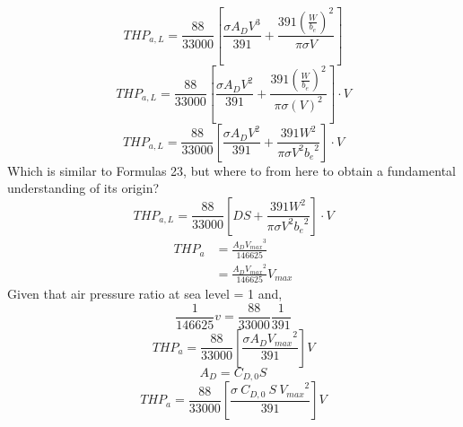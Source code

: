 \documentclass{article}
\begin{document}
\[
THP_{a,L}=\frac{88}{33000}\left[\frac{\sigma A_D V^3}{391}+\frac{391\left(\frac{W}{b_e}\right)^2}{\pi \sigma V}\right]
\]
\[
THP_{a,L}=\frac{88}{33000}\left[\frac{\sigma A_D V^2}{391}+\frac{391\left(\frac{W}{b_e}\right)^2}{\pi \sigma (V)^2}\right]\cdot V
\]
\[
THP_{a,L}=\frac{88}{33000}\left[\frac{\sigma A_D V^2}{391}+\frac{391W^2}{\pi \sigma V^2{b_e}^2}\right]\cdot V
\]
Which is similar to Formulas 23, but where to from here to obtain a fundamental understanding of its origin?
\[
THP_{a,L}=\frac{88}{33000}\left[DS+\frac{391W^2}{\pi \sigma V^2{b_e}^2}\right]\cdot V
\]
\begin{align*}
THP_a&=\frac{A_D {V_{max}}^3}{146625}\\
&=\frac{A_D {V_{max}}^2}{146625} V_{max}
\end{align*}
Given that air pressure ratio at sea level = 1 and,
\[
\frac{1}{146625}v = \frac{88}{33000}\frac{1}{391}
\]
\[
THP_a=\frac{88}{33000}\left[\frac{\sigma A_D {V_{max}}^2}{391}\right]V
\]
\[
A_D = C_{D,0}S
\]
\[
THP_a=\frac{88}{33000}\left[\frac{\sigma\ C_{D,0}\ S\ {V_{max}}^2}{391}\right]V
\]
\end{document}
